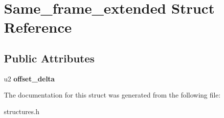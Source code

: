 \hypertarget{structSame__frame__extended}{}\section{Same\+\_\+frame\+\_\+extended Struct Reference}
\label{structSame__frame__extended}
\subsection*{Public Attributes}
\begin{DoxyCompactItemize}
\item 
u2 {\bfseries offset\+\_\+delta}\hypertarget{structSame__frame__extended_a0305c6ff9d2d1e7b2290435c7de737c7}{}\label{structSame__frame__extended_a0305c6ff9d2d1e7b2290435c7de737c7}

\end{DoxyCompactItemize}


The documentation for this struct was generated from the following file\+:\begin{DoxyCompactItemize}
\item 
structures.\+h\end{DoxyCompactItemize}
